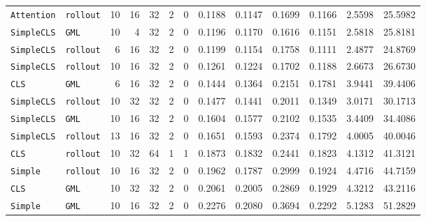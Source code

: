 \begin{table}[H]
\begin{tabular}{
l
l
r
r
r
r
r
S[table-format=1.4]
S[table-format=1.4]
S[table-format=2.4]
S[table-format=2.4]
S[table-format=3.4]
S[table-format=4.4]
}
\texttt{Attention} & \texttt{rollout} & 10 & \textcolor{gray!55}{16} & \textcolor{gray!55}{32} & 2 & 0 & 0.1188 & 0.1147 & 0.1699 & 0.1166 & 2.5598 & 25.5982 \\
\texttt{SimpleCLS} & \texttt{GML} & \textcolor{gray!55}{10} & 4 & \textcolor{gray!55}{32} & \textcolor{gray!55}{2} & \textcolor{gray!55}{0} & 0.1196 & 0.1170 & 0.1616 & 0.1151 & 2.5818 & 25.8181 \\
\texttt{SimpleCLS} & \texttt{rollout} & 6 & \textcolor{gray!55}{16} & \textcolor{gray!55}{32} & \textcolor{gray!55}{2} & \textcolor{gray!55}{0} & 0.1199 & 0.1154 & 0.1758 & 0.1111 & 2.4877 & 24.8769 \\
\texttt{SimpleCLS} & \texttt{rollout} & 10 & \textcolor{gray!55}{16} & \textcolor{gray!55}{32} & \textcolor{gray!55}{2} & \textcolor{gray!55}{0} & 0.1261 & 0.1224 & 0.1702 & 0.1188 & 2.6673 & 26.6730 \\
\texttt{CLS} & \texttt{GML} & 6 & \textcolor{gray!55}{16} & \textcolor{gray!55}{32} & \textcolor{gray!55}{2} & \textcolor{gray!55}{0} & 0.1444 & 0.1364 & 0.2151 & 0.1781 & 3.9441 & 39.4406 \\
\texttt{SimpleCLS} & \texttt{rollout} & \textcolor{gray!55}{10} & 32 & \textcolor{gray!55}{32} & \textcolor{gray!55}{2} & \textcolor{gray!55}{0} & 0.1477 & 0.1441 & 0.2011 & 0.1349 & 3.0171 & 30.1713 \\
\texttt{SimpleCLS} & \texttt{GML} & \textcolor{gray!55}{10} & \textcolor{gray!55}{16} & \textcolor{gray!55}{32} & \textcolor{gray!55}{2} & \textcolor{gray!55}{0} & 0.1604 & 0.1577 & 0.2102 & 0.1535 & 3.4409 & 34.4086 \\
\texttt{SimpleCLS} & \texttt{rollout} & 13 & \textcolor{gray!55}{16} & \textcolor{gray!55}{32} & \textcolor{gray!55}{2} & \textcolor{gray!55}{0} & 0.1651 & 0.1593 & 0.2374 & 0.1792 & 4.0005 & 40.0046 \\
\texttt{CLS} & \texttt{rollout} & 10 & 32 & 64 & 1 & 1 & 0.1873 & 0.1832 & 0.2441 & 0.1823 & 4.1312 & 41.3121 \\
\texttt{Simple} & \texttt{rollout} & 10 & \textcolor{gray!55}{16} & \textcolor{gray!55}{32} & \textcolor{gray!55}{2} & \textcolor{gray!55}{0} & 0.1962 & 0.1787 & 0.2999 & 0.1924 & 4.4716 & 44.7159 \\
\texttt{CLS} & \texttt{GML} & \textcolor{gray!55}{10} & 32 & \textcolor{gray!55}{32} & \textcolor{gray!55}{2} & \textcolor{gray!55}{0} & 0.2061 & 0.2005 & 0.2869 & 0.1929 & 4.3212 & 43.2116 \\
\texttt{Simple} & \texttt{GML} & 10 & \textcolor{gray!55}{16} & \textcolor{gray!55}{32} & \textcolor{gray!55}{2} & \textcolor{gray!55}{0} & 0.2276 & 0.2080 & 0.3694 & 0.2292 & 5.1283 & 51.2829 \\

\end{tabular}
\end{table}
